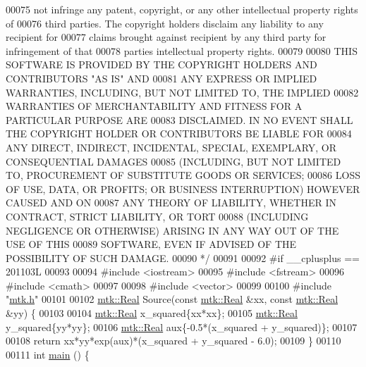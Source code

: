 \begin{DoxyCode}
00075 \textcolor{comment}{not infringe any patent, copyright, or any other intellectual property rights of}
00076 \textcolor{comment}{third parties. The copyright holders disclaim any liability to any recipient for}
00077 \textcolor{comment}{claims brought against recipient by any third party for infringement of that}
00078 \textcolor{comment}{parties intellectual property rights.}
00079 \textcolor{comment}{}
00080 \textcolor{comment}{THIS SOFTWARE IS PROVIDED BY THE COPYRIGHT HOLDERS AND CONTRIBUTORS "AS IS" AND}
00081 \textcolor{comment}{ANY EXPRESS OR IMPLIED WARRANTIES, INCLUDING, BUT NOT LIMITED TO, THE IMPLIED}
00082 \textcolor{comment}{WARRANTIES OF MERCHANTABILITY AND FITNESS FOR A PARTICULAR PURPOSE ARE}
00083 \textcolor{comment}{DISCLAIMED. IN NO EVENT SHALL THE COPYRIGHT HOLDER OR CONTRIBUTORS BE LIABLE FOR}
00084 \textcolor{comment}{ANY DIRECT, INDIRECT, INCIDENTAL, SPECIAL, EXEMPLARY, OR CONSEQUENTIAL DAMAGES}
00085 \textcolor{comment}{(INCLUDING, BUT NOT LIMITED TO, PROCUREMENT OF SUBSTITUTE GOODS OR SERVICES;}
00086 \textcolor{comment}{LOSS OF USE, DATA, OR PROFITS; OR BUSINESS INTERRUPTION) HOWEVER CAUSED AND ON}
00087 \textcolor{comment}{ANY THEORY OF LIABILITY, WHETHER IN CONTRACT, STRICT LIABILITY, OR TORT}
00088 \textcolor{comment}{(INCLUDING NEGLIGENCE OR OTHERWISE) ARISING IN ANY WAY OUT OF THE USE OF THIS}
00089 \textcolor{comment}{SOFTWARE, EVEN IF ADVISED OF THE POSSIBILITY OF SUCH DAMAGE.}
00090 \textcolor{comment}{*/}
00091 
00092 \textcolor{preprocessor}{#if \_\_cplusplus == 201103L}
00093 
00094 \textcolor{preprocessor}{#include <iostream>}
00095 \textcolor{preprocessor}{#include <fstream>}
00096 \textcolor{preprocessor}{#include <cmath>}
00097 
00098 \textcolor{preprocessor}{#include <vector>}
00099 
00100 \textcolor{preprocessor}{#include "\hyperlink{mtk_8h}{mtk.h}"}
00101 
00102 \hyperlink{group__c01-roots_gac080bbbf5cbb5502c9f00405f894857d}{mtk::Real} Source(\textcolor{keyword}{const} \hyperlink{group__c01-roots_gac080bbbf5cbb5502c9f00405f894857d}{mtk::Real} &xx, \textcolor{keyword}{const} \hyperlink{group__c01-roots_gac080bbbf5cbb5502c9f00405f894857d}{mtk::Real} &yy) \{
00103 
00104   \hyperlink{group__c01-roots_gac080bbbf5cbb5502c9f00405f894857d}{mtk::Real} x\_squared\{xx*xx\};
00105   \hyperlink{group__c01-roots_gac080bbbf5cbb5502c9f00405f894857d}{mtk::Real} y\_squared\{yy*yy\};
00106   \hyperlink{group__c01-roots_gac080bbbf5cbb5502c9f00405f894857d}{mtk::Real} aux\{-0.5*(x\_squared + y\_squared)\};
00107 
00108   \textcolor{keywordflow}{return} xx*yy*exp(aux)*(x\_squared + y\_squared - 6.0);
00109 \}
00110 
00111 \textcolor{keywordtype}{int} \hyperlink{poisson__2d_8cc_ae66f6b31b5ad750f1fe042a706a4e3d4}{main} () \{

\end{DoxyCode}
